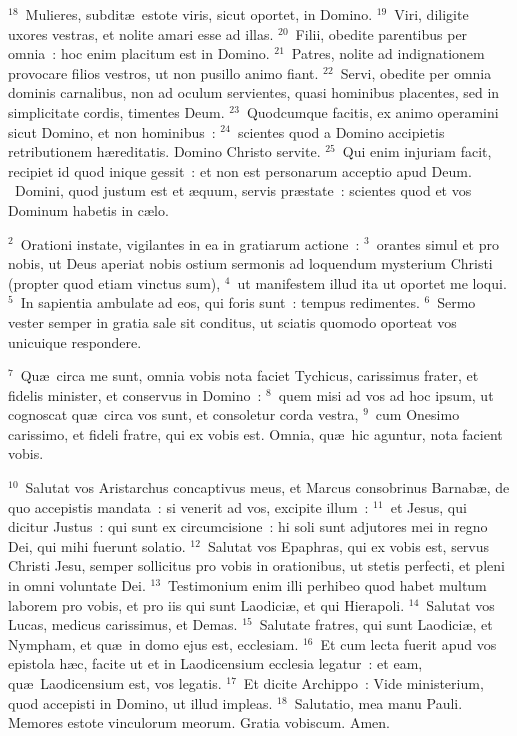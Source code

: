 ${}^{18}$~Mulieres, subdit\ae\ estote viris, sicut oportet, in Domino.
${}^{19}$~Viri, diligite uxores vestras, et nolite amari esse ad illas.
${}^{20}$~Filii, obedite parentibus per omnia~: hoc enim placitum est in Domino.
${}^{21}$~Patres, nolite ad indignationem provocare filios vestros, ut non pusillo animo fiant.
${}^{22}$~Servi, obedite per omnia dominis carnalibus, non ad oculum servientes, quasi hominibus placentes, sed in simplicitate cordis, timentes Deum.
${}^{23}$~Quodcumque facitis, ex animo operamini sicut Domino, et non hominibus~:
${}^{24}$~scientes quod a Domino accipietis retributionem h\ae reditatis. Domino Christo servite.
${}^{25}$~Qui enim injuriam facit, recipiet id quod inique gessit~: et non est personarum acceptio apud Deum.
~Domini, quod justum est et \ae quum, servis pr\ae state~: scientes quod et vos Dominum habetis in c\ae lo.


${}^{2}$~Orationi instate, vigilantes in ea in gratiarum actione~:
${}^{3}$~orantes simul et pro nobis, ut Deus aperiat nobis ostium sermonis ad loquendum mysterium Christi (propter quod etiam vinctus sum),
${}^{4}$~ut manifestem illud ita ut oportet me loqui.
${}^{5}$~In sapientia ambulate ad eos, qui foris sunt~: tempus redimentes.
${}^{6}$~Sermo vester semper in gratia sale sit conditus, ut sciatis quomodo oporteat vos unicuique respondere.


${}^{7}$~Qu\ae\ circa me sunt, omnia vobis nota faciet Tychicus, carissimus frater, et fidelis minister, et conservus in Domino~:
${}^{8}$~quem misi ad vos ad hoc ipsum, ut cognoscat qu\ae\ circa vos sunt, et consoletur corda vestra,
${}^{9}$~cum Onesimo carissimo, et fideli fratre, qui ex vobis est. Omnia, qu\ae\ hic aguntur, nota facient vobis.


${}^{10}$~Salutat vos Aristarchus concaptivus meus, et Marcus consobrinus Barnab\ae , de quo accepistis mandata~: si venerit ad vos, excipite illum~:
${}^{11}$~et Jesus, qui dicitur Justus~: qui sunt ex circumcisione~: hi soli sunt adjutores mei in regno Dei, qui mihi fuerunt solatio.
${}^{12}$~Salutat vos Epaphras, qui ex vobis est, servus Christi Jesu, semper sollicitus pro vobis in orationibus, ut stetis perfecti, et pleni in omni voluntate Dei.
${}^{13}$~Testimonium enim illi perhibeo quod habet multum laborem pro vobis, et pro iis qui sunt Laodici\ae , et qui Hierapoli.
${}^{14}$~Salutat vos Lucas, medicus carissimus, et Demas.
${}^{15}$~Salutate fratres, qui sunt Laodici\ae , et Nympham, et qu\ae\ in domo ejus est, ecclesiam.
${}^{16}$~Et cum lecta fuerit apud vos epistola h\ae c, facite ut et in Laodicensium ecclesia legatur~: et eam, qu\ae\ Laodicensium est, vos legatis.
${}^{17}$~Et dicite Archippo~: Vide ministerium, quod accepisti in Domino, ut illud impleas.
${}^{18}$~Salutatio, mea manu Pauli. Memores estote vinculorum meorum. Gratia vobiscum. Amen.
